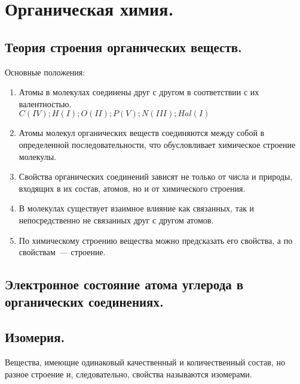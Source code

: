 \documentclass{article}
\begin{document}
	\tableofcontents
	\setcounter{tocdepth}{3}
	\newpage
	\section{Органическая химия.}
	\subsection{Теория строения органических веществ.}
	\begin{definition}
		Основные положения:
		\begin{enumerate}
			\item Атомы в молекулах соединены друг с другом в соответствии с их валентностью. \\
			$C (IV); H (I); O (II); P (V); N (III); Hal (I)$
			\item Атомы молекул органических веществ соединяются между собой в определенной последовательности, что обусловливает химическое строение молекулы.
			\item Свойства органических соединений зависят не только от числа и природы, входящих в их состав, атомов, но и от химического строения.
			\item В молекулах существует взаимное влияние как связанных, так и непосредственно не связанных друг с другом атомов.
			\item По химическому строению вещества можно предсказать его свойства, а по свойствам~--- строение.
		\end{enumerate}
	\end{definition}
	\subsection{Электронное состояние атома углерода в органических соединениях.}
	\subsection{Изомерия.}
	\begin{definition}
		Вещества, имеющие одинаковый качественный и количественный состав, но разное строение и, следовательно, свойства называются изомерами.
	\end{definition}
\end{document}
